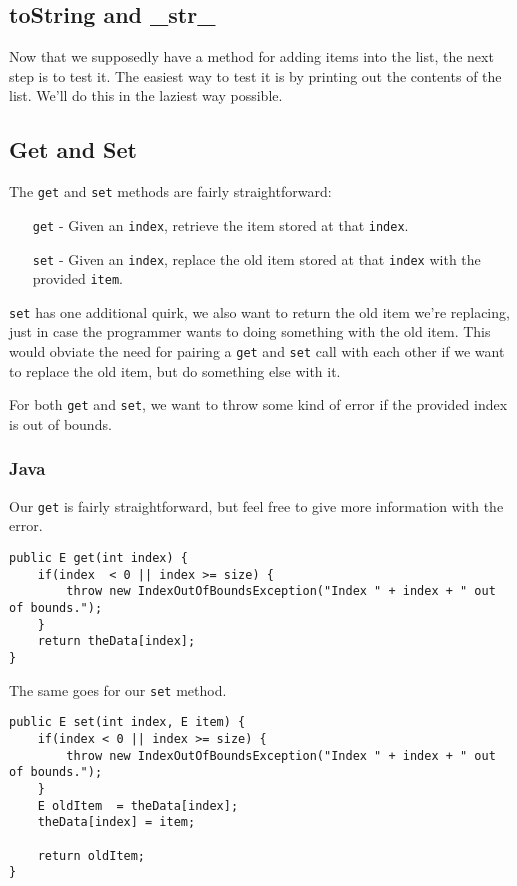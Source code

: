 \subsection{toString and \_str\_}
Now that we supposedly have a method for adding items into the list, the next step is to test it.  
The easiest way to test it is by printing out the contents of the list.  
We'll do this in the laziest way possible.





\subsection{Get and Set}
The \texttt{get} and \texttt{set} methods are fairly straightforward:
\begin{enumerate}
\item[\texttt{get} -] Given an \texttt{index}, retrieve the item stored at that \texttt{index}.
\item[\texttt{set} -] Given an \texttt{index}, replace the old item stored at that \texttt{index} with the provided \texttt{item}.
\end{enumerate}
\texttt{set} has one additional quirk, we also want to return the old item we're replacing, just in case the programmer wants to doing something with the old item.
This would obviate the need for pairing a \texttt{get} and \texttt{set} call with each other if we want to replace the old item, but do something else with it. 

For both \texttt{get} and \texttt{set}, we want to throw some kind of error if the provided index is out of bounds.
\subsubsection{Java}
Our \texttt{get} is fairly straightforward, but feel free to give more information with the error.
\begin{verbatim}
public E get(int index) {
	if(index  < 0 || index >= size) {
		throw new IndexOutOfBoundsException("Index " + index + " out of bounds.");
	}
	return theData[index];
}
\end{verbatim}

The same goes for our \texttt{set} method. 
\begin{verbatim}
public E set(int index, E item) {
	if(index < 0 || index >= size) {
		throw new IndexOutOfBoundsException("Index " + index + " out of bounds.");
	}
	E oldItem  = theData[index];
	theData[index] = item;
	
	return oldItem;
}
\end{verbatim}

